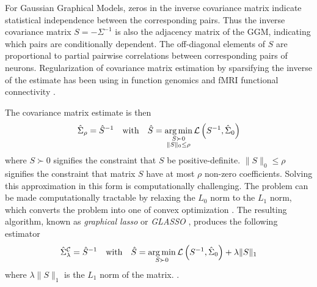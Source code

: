 For Gaussian Graphical Models, zeros in the inverse covariance matrix indicate statistical independence between the corresponding pairs. Thus the inverse covariance matrix $S=-\Sigma^{-1}$ is also the adjacency matrix of the GGM, indicating which pairs are conditionally dependent.     The off-diagonal elements of $S$ are proportional to partial pairwise correlations between corresponding pairs of neurons.  Regularization of covariance matrix estimation by sparsifying the inverse of the estimate has been using in function genomics \cite{Schafer:2005,other} and fMRI functional connectivity \cite{Varoquaux:2012}. 

The covariance matrix estimate is then 
\begin{equation}
\hat\Sigma_\rho = \hat S^{-1}
\quad\mbox{with}\quad
\hat S = \operatorname*{arg\,min}\limits_{\substack{S\succ 0 \\ \|S\|_0 \le \rho}} \mathcal L\left(S^{-1},\hat\Sigma_0\right)   
\end{equation}
where $S\succ 0$ signifies the constraint that $S$ be positive-definite. $\|S\|_0\le\rho$ signifies the constraint  that matrix $S$ have at most $\rho$ non-zero coefficients.
Solving this approximation in this form is computationally challenging. The problem can be made computationally tractable by relaxing  the $L_0$ norm to the $L_1$ norm, which converts the problem into one of convex optimization \cite{Donoho:2000}.  The resulting algorithm, known as \emph{graphical lasso} or \emph{GLASSO}  \cite{Meinshausen:2006,Yuan:2007,Banerjee:2008,Friedman:2008}, produces the following estimator  
\begin{equation}
\hat\Sigma_\lambda^\mathcal{C} = \hat S^{-1}
\quad\mbox{with}\quad
\hat S = \operatorname*{arg\,min}\limits_{S\succ 0} \mathcal L\left(S^{-1},\hat\Sigma_0\right) + \lambda \|S\|_1
\end{equation}
where $\lambda \|S\|_1$ is the $L_1$ norm of the matrix. . 

